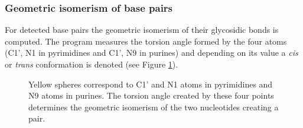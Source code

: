 \documentclass[12pt]{article}
\begin{document}
\subsubsection{Geometric isomerism of base pairs}
For detected base pairs the geometric isomerism of their glycosidic bonds is computed. The program measures the torsion angle formed by the four atoms (C1', N1 in pyrimidines and C1', N9 in purines) and depending on its value a {\it cis} or {\it trans} conformation is denoted (see Figure \ref{Conf}).

\begin{figure}[h!]
\begin{center}
\end{center}
\caption{Yellow spheres correspond to C1' and N1 atoms in pyrimidines and N9 atoms in purines. The torsion angle created by these four points determines the geometric isomerism of the two nucleotides creating a pair. }
\label{Conf}
\end{figure}

\end{document}
